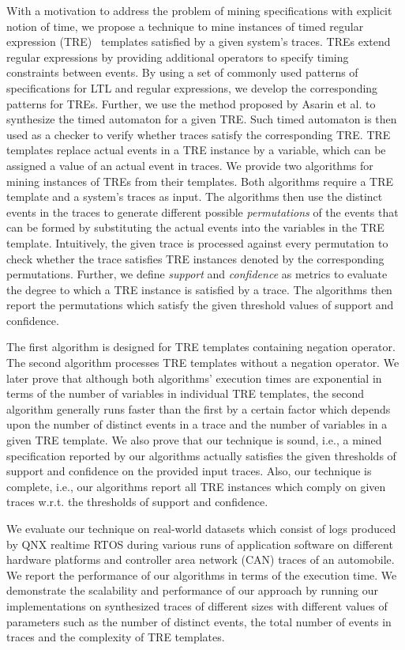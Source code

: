 \documentclass[]{sigplanconf}
\begin{document}
With a motivation to address the problem of mining specifications with explicit notion of time, we propose a technique to mine instances of timed regular expression (TRE)~\cite{timedregex} templates satisfied by a given system's traces. TREs extend regular expressions by providing additional operators to specify timing constraints between events. By using a set of commonly used patterns of specifications for LTL and regular expressions, we develop the corresponding patterns for TREs. Further, we use the method proposed by Asarin et al. \cite{timedregex} to synthesize the timed automaton for a given TRE. Such timed automaton is then used as a checker to verify whether traces satisfy the corresponding TRE. TRE templates replace actual events in a TRE instance by a variable, which can be assigned a value of an actual event in traces. We provide two algorithms for mining instances of TREs from their templates. Both algorithms require a TRE template and a system's traces as input. The algorithms then use the distinct events in the traces to generate different possible \emph{permutations} of the events that can be formed by substituting the actual events into the variables in the TRE template. Intuitively, the given trace is processed against every permutation to check whether the trace satisfies TRE instances denoted by the corresponding permutations. Further, we define \emph{support} and \emph{confidence} as metrics to evaluate the degree to which a TRE instance is satisfied by a trace. The algorithms then report the permutations which satisfy the given threshold values of support and confidence.

The first algorithm is designed for TRE templates containing negation operator. The second algorithm processes TRE templates without a negation operator. We later prove that although both algorithms' execution times are exponential in terms of the number of variables in individual TRE templates, the second algorithm generally runs faster than the first by a certain factor which depends upon the number of distinct events in a trace and the number of variables in a given TRE template. We also prove that our technique is sound, i.e., a mined specification reported by our algorithms actually satisfies the given thresholds of support and confidence on the provided input traces. Also, our technique is complete, i.e., our algorithms report all TRE instances which comply on given traces w.r.t. the thresholds of support and confidence.

We evaluate our technique on real-world datasets which consist of logs produced by QNX realtime RTOS  \cite{QNX_RTOS} during various runs of application software on different hardware platforms and controller area network (CAN) \cite{CAN}traces of an automobile. We report the performance of our algorithms in terms of the execution time. We demonstrate the scalability and performance of our approach by running our implementations on synthesized traces of different sizes with different values of parameters such as the number of distinct events, the total number of events in traces and the complexity of TRE templates.
\end{document}
